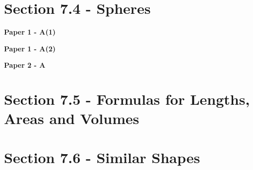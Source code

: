 \documentclass[12pt, a4paper]{article}
\begin{document}
\section*{Section 7.4 - Spheres}\label{section:3-7-4}

\textbf{Paper 1 - A(1)}
\begin{enumx}[label=\arabic*.,start=9]
\item {}\label{DSE2012S-CoreP1-Q06} 
\item {}\label{DSE2019-CoreP1-Q09} 
\end{enumx}
\textbf{Paper 1 - A(2)}
\begin{enumx}[label=\arabic*.,start=11]
\item {}\label{DSE2012-CoreP1-Q12} 
\item {}\label{DSE2018-CoreP1-Q14} 
\end{enumx}
\textbf{Paper 2 - A}
\begin{enumx}[label=\arabic*.,start=13]
\item {}\label{DSE2012S-CoreP2-Q17} 
\item {}\label{DSE2013-CoreP2-Q17} 
\item {}\label{DSE2022-CoreP2-Q15} 
\end{enumx}




\section*{Section 7.5 - Formulas for Lengths, Areas and Volumes}\label{section:3-7-5}





\section*{Section 7.6 - Similar Shapes}\label{section:3-7-6}
\end{document}
